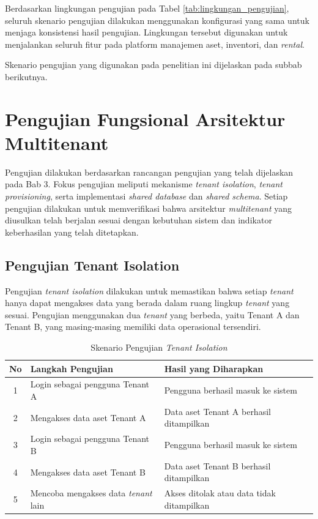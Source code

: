 Berdasarkan lingkungan pengujian pada Tabel \ref{tab:lingkungan_pengujian}, seluruh skenario pengujian dilakukan menggunakan konfigurasi yang sama untuk menjaga konsistensi hasil pengujian. Lingkungan tersebut digunakan untuk menjalankan seluruh fitur pada platform manajemen aset, inventori, dan \textit{rental}.

Skenario pengujian yang digunakan pada penelitian ini dijelaskan pada subbab berikutnya.

\section{Pengujian Fungsional Arsitektur Multitenant}

Pengujian dilakukan berdasarkan rancangan pengujian yang telah dijelaskan pada Bab 3. Fokus pengujian meliputi mekanisme \textit{tenant isolation}, \textit{tenant provisioning}, serta implementasi \textit{shared database} dan \textit{shared schema}. Setiap pengujian dilakukan untuk memverifikasi bahwa arsitektur \textit{multitenant} yang diusulkan telah berjalan sesuai dengan kebutuhan sistem dan indikator keberhasilan yang telah ditetapkan.

\subsection{Pengujian Tenant Isolation}

Pengujian \textit{tenant isolation} dilakukan untuk memastikan bahwa setiap \textit{tenant} hanya dapat mengakses data yang berada dalam ruang lingkup \textit{tenant} yang sesuai. Pengujian menggunakan dua \textit{tenant} yang berbeda, yaitu Tenant A dan Tenant B, yang masing-masing memiliki data operasional tersendiri.

\begin{table}[H]
  \centering
  \caption{Skenario Pengujian \textit{Tenant Isolation}}
  \label{tab:skenario_pengujian_tenant_isolation}
  \footnotesize
  \begin{tabular}{|c|p{6cm}|p{6.5cm}|}
    \hline
    \rowcolor[HTML]{EFEFEF}
    \textbf{No} & \textbf{Langkah Pengujian} & \textbf{Hasil yang Diharapkan} \\
    \hline
    1 & Login sebagai pengguna Tenant A & Pengguna berhasil masuk ke sistem \\
    \hline
    2 & Mengakses data aset Tenant A & Data aset Tenant A berhasil ditampilkan \\
    \hline
    3 & Login sebagai pengguna Tenant B & Pengguna berhasil masuk ke sistem \\
    \hline
    4 & Mengakses data aset Tenant B & Data aset Tenant B berhasil ditampilkan \\
    \hline
    5 & Mencoba mengakses data \textit{tenant} lain & Akses ditolak atau data tidak ditampilkan \\
    \hline
  \end{tabular}
\end{table}

